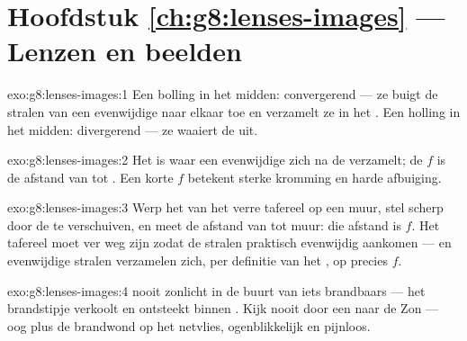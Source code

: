 \section*{Hoofdstuk \ref{ch:g8:lenses-images} --- Lenzen en beelden}

\begin{solution}{exo:g8:lenses-images:1}
Een bolling in het midden: convergerend --- ze buigt de stralen van een
evenwijdige  naar elkaar toe en verzamelt ze in het
. Een holling in het midden: divergerend --- ze waaiert de
 uit.
\end{solution}

\begin{solution}{exo:g8:lenses-images:2}
Het  is waar een evenwijdige  zich na
de  verzamelt; de  $f$ is de
afstand van  tot . Een korte $f$ betekent sterke kromming
en harde afbuiging.
\end{solution}

\begin{solution}{exo:g8:lenses-images:3}
Werp het  van het verre tafereel op een muur, stel scherp
door de  te verschuiven, en meet de afstand van
 tot muur: die afstand is $f$. Het tafereel moet ver weg zijn zodat
de stralen praktisch evenwijdig aankomen --- en evenwijdige stralen
verzamelen zich, per definitie van het , op precies $f$.
\end{solution}

\begin{solution}{exo:g8:lenses-images:4}
 nooit zonlicht in de buurt van iets brandbaars --- het
brandstipje verkoolt en ontsteekt binnen . Kijk nooit door een
 naar de Zon --- oog plus   de
brandwond op het netvlies, ogenblikkelijk en pijnloos.
\end{solution}

